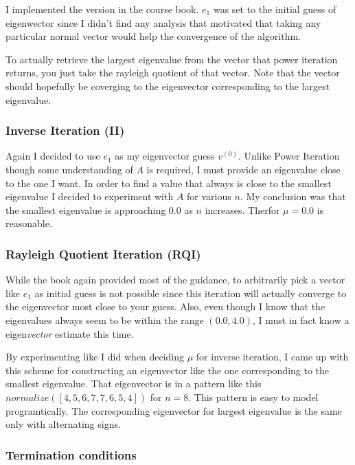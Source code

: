 \documentclass[a4paper,11pt]{article}
\begin{document}
I implemented the version in the course book.  $e_1$ was set to the
initial guess of eigenwector since I didn't find any analysis that
motivated that taking any particular normal vector would help the
convergence of the algorithm.

To actually retrieve the largest eigenvalue from the vector that power
iteration returns, you just take the rayleigh quotient of that vector.
Note that the vector should hopefully be coverging to the eigenvector
corresponding to the largest eigenvalue.

\subsubsection{Inverse Iteration (II)}

Again I decided to use $e_1$ as my eigenvector guess $v^{(0)}$.
Unlike Power Iteration though some understanding of $A$ is required, I
must provide an eigenvalue close to the one I want. In order to find a
value that always is close to the smallest eigenvalue I decided to
experiment with $A$ for various $n$. My conclusion was that the smallest
eigenvalue is approaching $0.0$ as $n$ increases. Therfor $\mu=0.0$ is
reasonable.

\subsubsection{Rayleigh Quotient Iteration (RQI)}

While the book again provided most of the guidance, to arbitrarily pick
a vector like $e_1$ as initial guess is not possible since this
iteration will actually converge to the eigenvector most close to your
guess. Also, even though I know that the eigenvalues always seem to be
within the range $(0.0, 4.0)$, I must in fact know a
eigen\emph{vector} estimate this time.

By experimenting like I did when deciding $\mu$ for inverse iteration, I
came up with this scheme for constructing an eigenvector like the one
corresponding to the smallest eigenvalue. That eigenvector is in a
pattern like this $normalize([4, 5, 6, 7, 7, 6, 5, 4])$ for $n=8$.  This
pattern is easy to model programtically. The corresponding eigenvector
for largest eigenvalue is the same only with alternating signs.

\subsubsection{Termination conditions}
\end{document}
